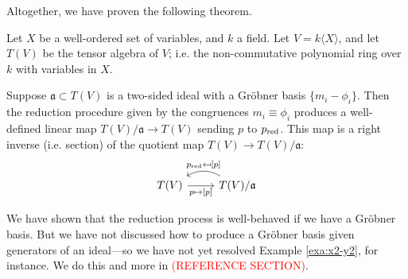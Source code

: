 Altogether, we have proven the following theorem.
\begin{thm}\label{thm:grobner-thm}
	Let $X$ be a well-ordered set of variables, and $k$ a field. Let $V = k\langle X \rangle$, and let $T(V)$ be the tensor algebra of $V$; i.e. the non-commutative polynomial ring over $k$ with variables in $X$.
	
	Suppose $\mathfrak{a} \subset T(V)$ is a two-sided ideal with a Gr\"obner basis $\{m_i - \phi_i\}$. Then the reduction procedure given by the congruences $m_i \equiv \phi_i$ produces a well-defined linear map $T(V)/\mathfrak{a} \to T(V)$ sending $p$ to $p_{\mathrm{red}}$. This map is a right inverse (i.e. section) of the quotient map $T(V) \to T(V)/\mathfrak{a}$:
	\[\begin{tikzcd}
	T(V) \arrow[r, "p \mapsto {[p]}",swap] & \arrow[l,bend right, swap," p_\red \mapsfrom {[p]}"] T(V)/\mathfrak{a}
	\end{tikzcd}\]
\end{thm}
We have shown that the reduction process is well-behaved if we have a Gr\"obner basis. But we have not discussed how to produce a Gr\"obner basis given generators of an ideal---so we have not yet resolved Example \ref{exa:x2-y2}, for instance. We do this and more in \textcolor{red}{(REFERENCE SECTION)}.
